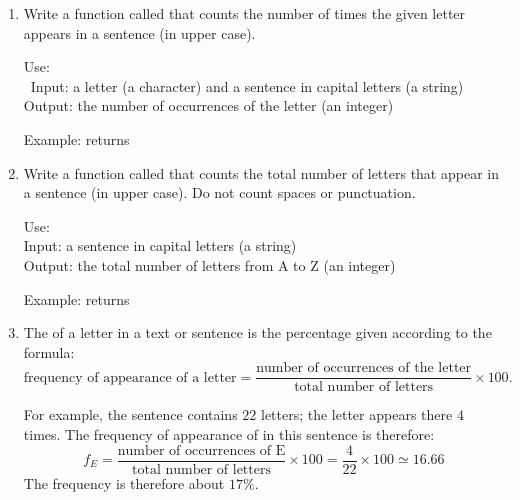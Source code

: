 \documentclass[11pt,class=report,crop=false]{standalone}
\begin{document}
\begin{activite}


\begin{enumerate}
  \item Write a function called  that counts the number of times the given letter appears in a sentence (in upper case).
  
    \begin{fonction}
   Use: \\\
   Input: a letter (a character) and a sentence in capital letters (a string)\\
   Output: the number of occurrences of the letter (an integer)
  
  \medskip
     
   Example:  returns 
  \end{fonction}
  
 \item Write a function called  that counts the total number of letters that appear in a sentence (in upper case). Do not count spaces or punctuation.
 
     \begin{fonction}
   Use: \\
   Input: a sentence in capital letters (a string)\\
   Output: the total number of letters from \og{}A\fg{} to \og{}Z\fg{} (an integer)
  
  \medskip
     
   Example:  returns 
  \end{fonction}
 
 \item The  of a letter in a text or sentence is the percentage given according to the formula:
 $$\text{frequency of appearance of a letter} = \frac{\text{number of occurrences of the letter}}{\text{total number of letters}} \times 100.$$
 
 \medskip
 
 For example, the sentence  contains $22$ letters; 
  the letter  appears there $4$ times. The frequency of appearance of \mot{E} in this sentence is therefore:
  $$f_E = \frac{\text{number of occurrences of E}}{\text{total number of letters}} \times 100  = \frac{4}{22} \times  100 \simeq 16.66$$
 The frequency is therefore about $17\%$.
  

\end{enumerate}
\end{activite}
\end{document}
